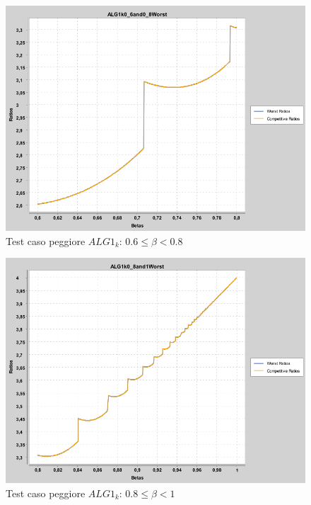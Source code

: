 \documentclass[12pt]{article}
\begin{document}
\begin{figure}[H]
\caption{Test caso peggiore $ALG1_{k}$: $0.6 \leq \beta < 0.8$}
\centering
\includegraphics[scale=0.4]{worst/ALG1k0_6and0_8Worst.png}
\end{figure}
\begin{figure}[H]
\caption{Test caso peggiore $ALG1_{k}$: $0.8 \leq \beta < 1$}
\centering
\includegraphics[scale=0.4]{worst/ALG1k0_8and1Worst.png}
\end{figure}
\end{document}
